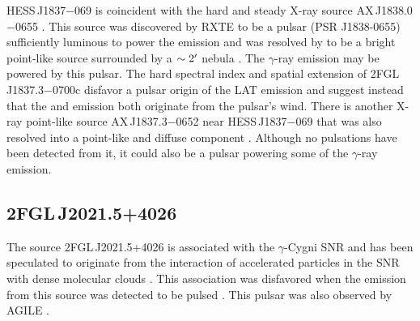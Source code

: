 HESS\,J1837$-$069 is coincident with the hard and steady X-ray source
AX\,J1838.0$-$0655 \citep{bamba_2003a_diffuse-x-ray}.  This source was discovered
by RXTE to be a pulsar (PSR J1838-0655) 
sufficiently luminous to power the \tev emission
and was resolved by \chandra to be a bright point-like source surrounded
by a $\sim2\mbox{$^\prime$}$ nebula \citep{gotthelf_2008a_discovery-young}. The
$\gamma$-ray emission may be powered by this pulsar.  The hard spectral
index and spatial extension of 2FGL\,J1837.3$-$0700c disfavor a pulsar
origin of the LAT emission and suggest instead that the \gev and \tev
emission both originate from the pulsar's wind.  There is another
X-ray point-like source AX\,J1837.3$-$0652 near HESS\,J1837$-$069
\citep{bamba_2003a_diffuse-x-ray} that was also resolved into a point-like
and diffuse component \citep{gotthelf_2008a_discovery-young}.  Although no
pulsations have been detected from it, it could also be a pulsar powering
some of the $\gamma$-ray emission.


\subsection{2FGL\,J2021.5+4026}

The source 2FGL\,J2021.5+4026 is associated with the $\gamma$-Cygni SNR 
and has been speculated
to originate from the interaction of accelerated particles in the SNR
with dense molecular clouds \citep{pollock_1985a_probable-identification,gaisser_1998a_gamma-ray-production}. This
association was disfavored when the \gev emission from this source
was detected to be pulsed \citep[PSR\,J2021+4026,][]{abdo_2010a_first-fermi}.
This pulsar was also observed by AGILE \citep{chen_2011a_study-gamma-ray}.

